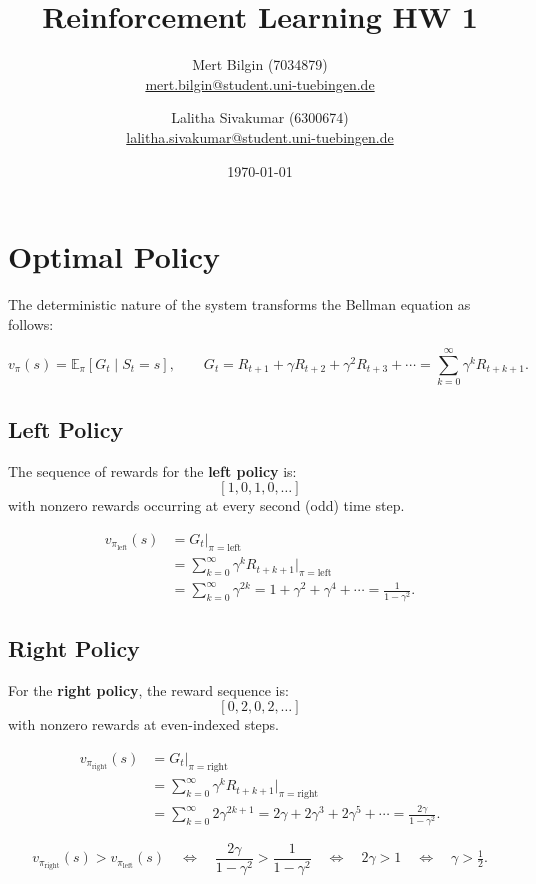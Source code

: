 \documentclass[11pt]{article}
\title{Reinforcement Learning HW 1}
\author{
Mert Bilgin (7034879) \\
\url{mert.bilgin@student.uni-tuebingen.de}
\and
Lalitha Sivakumar (6300674) \\
\url{lalitha.sivakumar@student.uni-tuebingen.de}
}
\date{\today}
\begin{document}
\maketitle

\section{Optimal Policy}

The deterministic nature of the system transforms the Bellman equation as follows:

\[
v_\pi(s) = \mathbb{E}_\pi \left[ G_t \mid S_t = s \right],
\qquad 
G_t = R_{t+1} + \gamma R_{t+2} + \gamma^2 R_{t+3} + \cdots
= \sum_{k=0}^{\infty} \gamma^k R_{t+k+1}.
\]

\subsection*{Left Policy}

The sequence of rewards for the \textbf{left policy} is:
\[
[1, 0, 1, 0, \dots]
\]
with nonzero rewards occurring at every second (odd) time step.

\[
\begin{aligned}
v_{\pi_{\text{left}}}(s) 
&= G_t \Big|_{\pi=\text{left}} \\
&= \sum_{k=0}^{\infty} \gamma^k R_{t+k+1}\Big|_{\pi=\text{left}} \\
&= \sum_{k=0}^{\infty} \gamma^{2k} 
= 1 + \gamma^2 + \gamma^4 + \cdots 
= \frac{1}{1 - \gamma^2}.
\end{aligned}
\]

\subsection*{Right Policy}

For the \textbf{right policy}, the reward sequence is:
\[
[0, 2, 0, 2, \dots]
\]
with nonzero rewards at even-indexed steps.

\[
\begin{aligned}
v_{\pi_{\text{right}}}(s)
&= G_t \Big|_{\pi=\text{right}} \\
&= \sum_{k=0}^{\infty} \gamma^k R_{t+k+1}\Big|_{\pi=\text{right}} \\
&= \sum_{k=0}^{\infty} 2\gamma^{2k+1} 
= 2\gamma + 2\gamma^3 + 2\gamma^5 + \cdots 
= \frac{2\gamma}{1 - \gamma^2}.
\end{aligned}
\]


\[
v_{\pi_{\text{right}}}(s) > v_{\pi_{\text{left}}}(s)
\quad \Longleftrightarrow \quad
\frac{2\gamma}{1 - \gamma^2} > \frac{1}{1 - \gamma^2}
\quad \Longleftrightarrow \quad
2\gamma > 1
\quad \Longleftrightarrow \quad
\gamma > \tfrac{1}{2}.
\]
\end{document}
